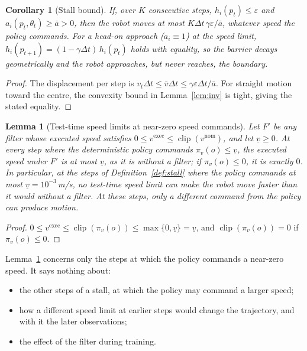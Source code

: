 \documentclass[11pt]{article}
\newtheorem{lemma}{Lemma}
\newtheorem{corollary}{Corollary}
\theoremstyle{definition}
\theoremstyle{remark}
\begin{document}
\begin{corollary}[Stall bound]\label{cor:stall}
If, over $K$ consecutive steps, $h_i(p_t)\le\varepsilon$ and $a_i(p_t,\theta_t)\ge\bar a>0$, then the robot moves at most $K\Delta t\,\gamma\varepsilon/\bar a$, whatever speed the policy commands. For a head-on approach ($a_i\equiv1$) at the speed limit, $h_i(p_{t+1})=(1-\gamma\Delta t)\,h_i(p_t)$ holds with equality, so the barrier decays geometrically and the robot approaches, but never reaches, the boundary.
\end{corollary}
\begin{proof}
The displacement per step is $v_t\Delta t\le\bar v\Delta t\le\gamma\varepsilon\Delta t/\bar a$. For straight motion toward the centre, the convexity bound in Lemma~\ref{lem:inv} is tight, giving the stated equality.
\end{proof}

\begin{lemma}[Test-time speed limits at near-zero speed commands]\label{prop:typeII}
Let $F'$ be any filter whose executed speed satisfies $0\le v^{\mathrm{exec}}\le\operatorname{clip}(v^{\mathrm{nom}})$, and let $\underline v\ge0$. At every step where the deterministic policy commands $\pi_v(o)\le\underline v$, the executed speed under $F'$ is at most $\underline v$, as it is without a filter; if $\pi_v(o)\le0$, it is exactly $0$. In particular, at the steps of Definition~\ref{def:stall} where the policy commands at most $\underline v=10^{-3}$\,m/s, no test-time speed limit can make the robot move faster than it would without a filter. At these steps, only a different command from the policy can produce motion.
\end{lemma}
\begin{proof}
$0\le v^{\mathrm{exec}}\le\operatorname{clip}(\pi_v(o))\le\max\{0,\underline v\}=\underline v$, and $\operatorname{clip}(\pi_v(o))=0$ if $\pi_v(o)\le0$.
\end{proof}
Lemma~\ref{prop:typeII} concerns only the steps at which the policy commands a near-zero speed. It says nothing about:
\begin{itemize}
  \item the other steps of a stall, at which the policy may command a larger speed;
  \item how a different speed limit at earlier steps would change the trajectory, and with it the later observations;
  \item the effect of the filter during training.
\end{itemize}
\end{document}
